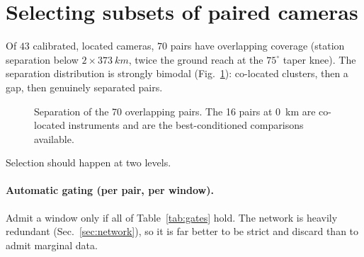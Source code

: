 \documentclass[11pt,a4paper]{article}
\begin{document}
\section{Selecting subsets of paired cameras}
\label{sec:selection}

Of $43$ calibrated, located cameras, $70$ pairs have overlapping coverage
(station separation below $2\times\SI{373}{km}$, twice the ground reach at the
$75^\circ$ taper knee). The separation distribution is strongly bimodal
(Fig.~\ref{fig:hist}): co-located clusters, then a gap, then genuinely separated
pairs.

\begin{figure}[h]
\centering
{}
\caption{Separation of the 70 overlapping pairs. The 16 pairs at \SI{0}{km} are
co-located instruments and are the best-conditioned comparisons available.}
\label{fig:hist}
\end{figure}

Selection should happen at two levels.

\paragraph{Automatic gating (per pair, per window).} Admit a window only if all
of Table~\ref{tab:gates} hold. The network is heavily redundant
(Sec.~\ref{sec:network}), so it is far better to be strict and discard than to
admit marginal data.
\end{document}
